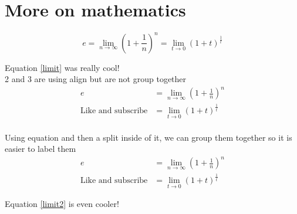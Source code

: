 \documentclass{article}
\begin{document}
\section{More on mathematics}
\begin{equation}
\label{limit}
e= \lim_{n\to\infty} \left(1+\frac{1}{n}\right)^n 
=\lim_{t\to 0}(1+t)^{\frac{1}{t}}
\end{equation}

Equation \ref{limit} was really cool!
\\2 and 3 are using align but are not group together
\begin{align}
e&= \lim_{n\to\infty} \left(1+\frac{1}{n}\right)^n\\
\text{Like and subscribe}&=\lim_{t\to 0}(1+t)^{\frac{1}{t}}
\end{align}
\\Using equation and then a split inside of it, we can group them together so it is easier to label them
\begin{equation}
\label{limit2}
\begin{split}
e&= \lim_{n\to\infty} \left(1+\frac{1}{n}\right)^n\\
\text{Like and subscribe}&=\lim_{t\to 0}(1+t)^{\frac{1}{t}}
\end{split}
\end{equation}

Equation \ref{limit2} is even cooler!
\end{document}
